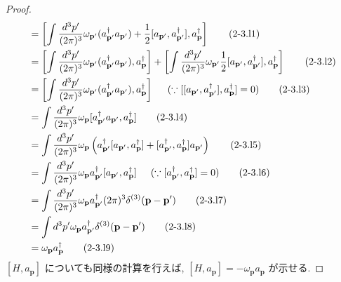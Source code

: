 \documentclass[a4paper,12pt]{article}
\begin{document}
\color{blue}
\begin{proof}
\begin{align*}
    [H, a_{\mathbf{p}}^{\dagger}] &= \left[ \int \frac{d^3 p'}{(2\pi)^3}\omega_{\mathbf{p}'}(a_{\mathbf{p}'}^{\dagger} a_{\mathbf{p}'}) + \frac{1}{2}[a_{\mathbf{p}'}, a_{\mathbf{p}'}^{\dagger}], a_{\mathbf{p}}^{\dagger} \right] \tag{2-3.l1}\\
    &= \left[ \int \frac{d^3 p'}{(2\pi)^3}\omega_{\mathbf{p}'}(a_{\mathbf{p}'}^{\dagger} a_{\mathbf{p}'}), a_{\mathbf{p}}^{\dagger} \right] + \left[ \int \frac{d^3 p'}{(2\pi)^3}\omega_{\mathbf{p}'} \frac{1}{2}[a_{\mathbf{p}'}, a_{\mathbf{p}'}^{\dagger}], a_{\mathbf{p}}^{\dagger} \right] \tag{2-3.l2}\\
    &= \left[ \int \frac{d^3 p'}{(2\pi)^3}\omega_{\mathbf{p}'}(a_{\mathbf{p}'}^{\dagger} a_{\mathbf{p}'}), a_{\mathbf{p}}^{\dagger} \right] \hspace{0.5cm}(\because [[a_{\mathbf{p}'}, a_{\mathbf{p}'}^{\dagger}], a_{\mathbf{p}}^{\dagger}] = 0) \tag{2-3.l3}\\
    &= \int \frac{d^3 p'}{(2\pi)^3}\omega_{\mathbf{p}}[a_{\mathbf{p}'}^{\dagger} a_{\mathbf{p}'}, a_{\mathbf{p}}^{\dagger}] \tag{2-3.l4}\\
    &= \int \frac{d^3 p'}{(2\pi)^3}\omega_{\mathbf{p}} \left( a_{\mathbf{p}'}^{\dagger} [a_{\mathbf{p}'}, a_{\mathbf{p}}^{\dagger}] + [a_{\mathbf{p}'}^{\dagger}, a_{\mathbf{p}}^{\dagger}] a_{\mathbf{p}'}\right) \tag{2-3.l5}\\
    &= \int \frac{d^3 p'}{(2\pi)^3}\omega_{\mathbf{p}} a_{\mathbf{p}'}^{\dagger}[a_{\mathbf{p}'}, a_{\mathbf{p}}^{\dagger}] \hspace{0.5cm}(\because [a_{\mathbf{p}'}^{\dagger}, a_{\mathbf{p}}^{\dagger}] = 0) \tag{2-3.l6}\\
    &= \int \frac{d^3 p'}{(2\pi)^3}\omega_{\mathbf{p}} a_{\mathbf{p}'}^{\dagger} (2\pi)^3 \delta^{(3)}(\mathbf{p}-\mathbf{p}') \tag{2-3.l7}\\
    &= \int d^3 p' \omega_{\mathbf{p}} a_{\mathbf{p}'}^{\dagger} \delta^{(3)}(\mathbf{p}-\mathbf{p}') \tag{2-3.l8}\\
    &= \omega_{\mathbf{p}} a_{\mathbf{p}}^{\dagger} \tag{2-3.l9}
\end{align*}
$[H, a_{\mathbf{p}}]$ についても同様の計算を行えば, $[H, a_{\mathbf{p}}] = -\omega_{\mathbf{p}} a_{\mathbf{p}}$ が示せる.


\end{proof}

\color{black}
\end{document}
